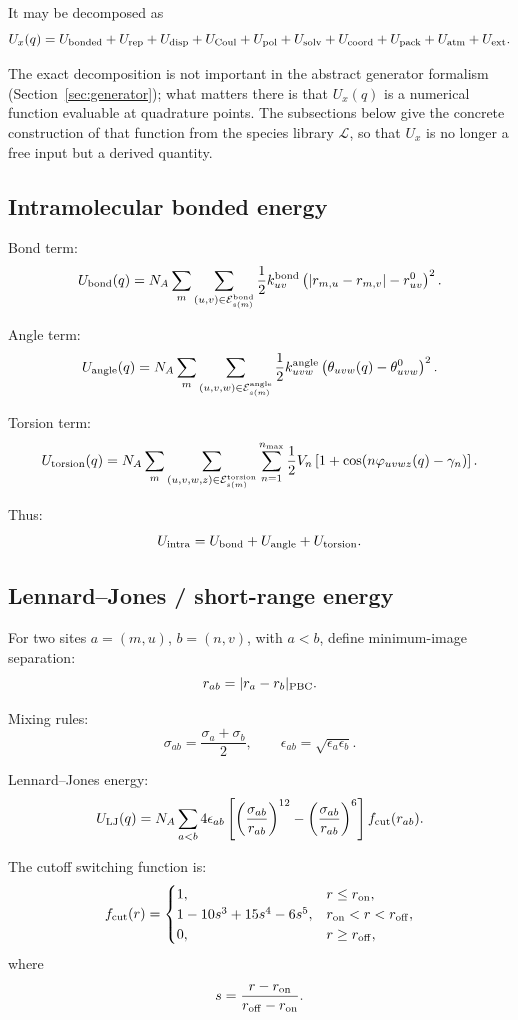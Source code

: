 \documentclass[11pt]{article}
\begin{document}
It may be decomposed as
\[
U_x(q)
=
U_{\rm bonded}
+
U_{\rm rep}
+
U_{\rm disp}
+
U_{\rm Coul}
+
U_{\rm pol}
+
U_{\rm solv}
+
U_{\rm coord}
+
U_{\rm pack}
+
U_{\rm atm}
+
U_{\rm ext}.
\]

The exact decomposition is not important in the abstract generator formalism
(Section~\ref{sec:generator}); what matters there is that \(U_x(q)\) is a
numerical function evaluable at quadrature points. The subsections below give
the concrete construction of that function from the species library
\(\mathcal L\), so that \(U_x\) is no longer a free input but a derived
quantity.

\subsection{Intramolecular bonded energy}

Bond term:
\[
U_{\rm bond}(q)
=
N_A
\sum_m
\sum_{(u,v)\in\mathcal E_{s(m)}^{\rm bond}}
\frac12 k_{uv}^{\rm bond}
\left(
|r_{m,u}-r_{m,v}|-r_{uv}^0
\right)^2.
\]

Angle term:
\[
U_{\rm angle}(q)
=
N_A
\sum_m
\sum_{(u,v,w)\in\mathcal E_{s(m)}^{\rm angle}}
\frac12 k_{uvw}^{\rm angle}
\left(
\theta_{uvw}(q)-\theta_{uvw}^0
\right)^2.
\]

Torsion term:
\[
U_{\rm torsion}(q)
=
N_A
\sum_m
\sum_{(u,v,w,z)\in\mathcal E_{s(m)}^{\rm torsion}}
\sum_{n=1}^{n_{\max}}
\frac12 V_n
\left[
1+\cos(n\varphi_{uvwz}(q)-\gamma_n)
\right].
\]

Thus:
\[
U_{\rm intra}=U_{\rm bond}+U_{\rm angle}+U_{\rm torsion}.
\]

\subsection{Lennard--Jones / short-range energy}

For two sites \(a=(m,u)\), \(b=(n,v)\), with \(a<b\), define minimum-image
separation:
\[
r_{ab}=|r_a-r_b|_{\rm PBC}.
\]

Mixing rules:
\[
\sigma_{ab}=\frac{\sigma_a+\sigma_b}{2},
\qquad
\epsilon_{ab}=\sqrt{\epsilon_a\epsilon_b}.
\]

Lennard--Jones energy:
\[
U_{\rm LJ}(q)
=
N_A
\sum_{a<b}
4\epsilon_{ab}
\left[
\left(\frac{\sigma_{ab}}{r_{ab}}\right)^{12}
-
\left(\frac{\sigma_{ab}}{r_{ab}}\right)^6
\right]f_{\rm cut}(r_{ab}).
\]

The cutoff switching function is:
\[
f_{\rm cut}(r)=
\begin{cases}
1, & r\le r_{\rm on},\\
1-10s^3+15s^4-6s^5, & r_{\rm on}<r<r_{\rm off},\\
0, & r\ge r_{\rm off},
\end{cases}
\]
where
\[
s=\frac{r-r_{\rm on}}{r_{\rm off}-r_{\rm on}}.
\]
\end{document}
